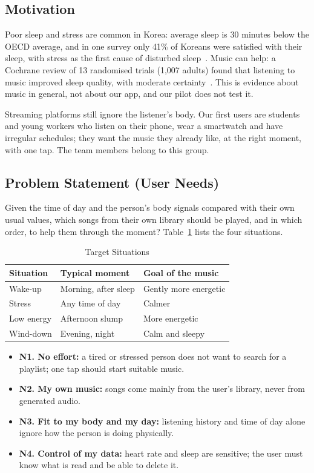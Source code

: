 \documentclass[conference]{IEEEtran}
\begin{document}
\subsection{Motivation}
Poor sleep and stress are common in Korea: average sleep is 30 minutes below the OECD average, and in one survey only 41\% of Koreans were satisfied with their sleep, with stress as the first cause of disturbed sleep~\cite{koreatimes_sleep}. Music can help: a Cochrane review of 13 randomised trials (1,007 adults) found that listening to music improved sleep quality, with moderate certainty~\cite{cochrane}. This is evidence about music in general, not about our app, and our pilot does not test it.

Streaming platforms still ignore the listener's body. Our first users are students and young workers who listen on their phone, wear a smartwatch and have irregular schedules; they want the music they already like, at the right moment, with one tap. The team members belong to this group.

\subsection{Problem Statement (User Needs)}\label{sec:needs}
Given the time of day and the person's body signals compared with their own usual values, which songs from their own library should be played, and in which order, to help them through the moment? Table~\ref{tab:situations} lists the four situations.

\begin{table}[H]
\centering
\caption{Target Situations}
\label{tab:situations}
\footnotesize
\begin{tabular}{|l|l|l|}
\hline
\textbf{Situation} & \textbf{Typical moment} & \textbf{Goal of the music} \\ \hline
Wake-up & Morning, after sleep & Gently more energetic \\ \hline
Stress & Any time of day & Calmer \\ \hline
Low energy & Afternoon slump & More energetic \\ \hline
Wind-down & Evening, night & Calm and sleepy \\ \hline
\end{tabular}
\end{table}

\begin{itemize}
\item \textbf{N1. No effort:} a tired or stressed person does not want to search for a playlist; one tap should start suitable music.
\item \textbf{N2. My own music:} songs come mainly from the user's library, never from generated audio.
\item \textbf{N3. Fit to my body and my day:} listening history and time of day alone ignore how the person is doing physically.
\item \textbf{N4. Control of my data:} heart rate and sleep are sensitive; the user must know what is read and be able to delete it.
\end{itemize}
\end{document}
